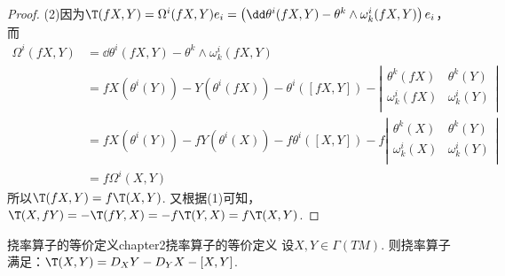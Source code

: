 \begin{proof}
	(2)\;因为$\T(fX,Y)=\Omega^{i}(fX,Y)e_{i}= \left(\dd \theta^{i}(fX,Y)-\theta^{k}\wedge\omega_{k}^{i}(fX,Y)\right)e_{i}$，而
	\[
	\begin{split}
	 \Omega^{i}(fX,Y)&=\dd \theta^{i}(fX,Y)-\theta^{k}\wedge\omega_{k}^{i}(fX,Y)\\
	 &=fX\left(\theta^{i}(Y) \right)-Y\left(\theta^{i}(fX) \right)-\theta^{i}\left([fX,Y] \right)-\left| \begin{array}{cc}{\theta^{k}(fX)} & {\theta^{k}(Y)}\\ {\omega_{k}^{i}(fX)} & {\omega_{k}^{i}(Y)}\\ \end{array}\right|\\
	 &= fX\left(\theta^{i}(Y) \right)-fY\left(\theta^{i}(X) \right)-f\theta^{i}\left([X,Y] \right)-f\left| \begin{array}{cc}{\theta^{k}(X)} & {\theta^{k}(Y)}\\ {\omega_{k}^{i}(X)} & {\omega_{k}^{i}(Y)}\\ \end{array}\right|\\
	 &= f \Omega^{i}(X,Y) 
	\end{split}
	\]
	所以$\T(fX,Y) =f\T(X,Y)$. 又根据(1)可知，$\T(X,fY)=-\T(fY,X)=-f\T(Y,X)=f\T(X,Y)$.
\end{proof}

\begin{mythm}{挠率算子的等价定义}{chapter2挠率算子的等价定义}
		设$X,Y\in \Gamma(TM)$. 则挠率算子满足：$\T(X,Y)=D_{X}Y-D_{Y}X-[X,Y]$.
\end{mythm}

